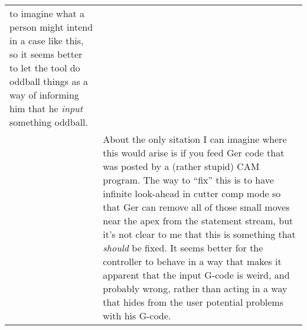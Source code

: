 \documentclass[titlepage,oneside,10pt]{article}
\begin{document}
\begin{longtable}{lp{10cm}}
to imagine what a person might intend in a case like this, so it seems
better to let the tool do oddball things as a way of informing him
that he \emph{input} something oddball. \\
& About the only sitation I
can imagine where this would arise is if you feed Ger code that was
posted by a (rather stupid) CAM program. The way to ``fix'' this is to
have infinite look-ahead in cutter comp mode so that Ger can remove
all of those small moves near the apex from the statement stream, but
it's not clear to me that this is something that \emph{should} be
fixed. It seems better for the controller to behave in a way that
makes it apparent that the input G-code is weird, and probably wrong, rather
than acting in a way that hides from the user potential problems with his
G-code. \\
\end{longtable}
\vskip 0.50cm
\end{document}
